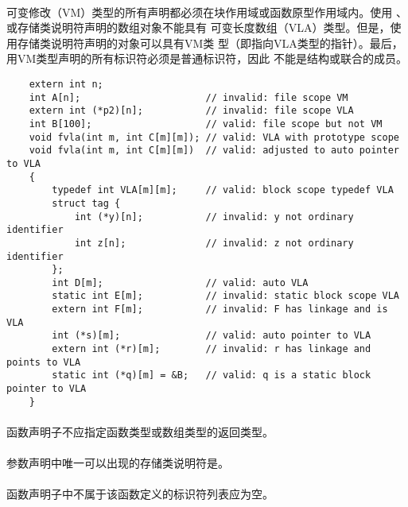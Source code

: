 \paragraph{}
\ex 可变修改（VM）类型的所有声明都必须在块作用域或函数原型作用域内。使用
、或存储类说明符声明的数组对象不能具有
可变长度数组（VLA）类型。但是，使用存储类说明符声明的对象可以具有VM类
型（即指向VLA类型的指针）。最后，用VM类型声明的所有标识符必须是普通标识符，因此
不能是结构或联合的成员。
\begin{lstlisting}
    extern int n;
    int A[n];                      // invalid: file scope VM
    extern int (*p2)[n];           // invalid: file scope VLA
    int B[100];                    // valid: file scope but not VM
    void fvla(int m, int C[m][m]); // valid: VLA with prototype scope
    void fvla(int m, int C[m][m])  // valid: adjusted to auto pointer to VLA
    {
        typedef int VLA[m][m];     // valid: block scope typedef VLA
        struct tag {
            int (*y)[n];           // invalid: y not ordinary identifier
            int z[n];              // invalid: z not ordinary identifier
        };
        int D[m];                  // valid: auto VLA
        static int E[m];           // invalid: static block scope VLA
        extern int F[m];           // invalid: F has linkage and is VLA
        int (*s)[m];               // valid: auto pointer to VLA
        extern int (*r)[m];        // invalid: r has linkage and points to VLA
        static int (*q)[m] = &B;   // valid: q is a static block pointer to VLA
    }
\end{lstlisting}


\constraint
\paragraph{}
函数声明子不应指定函数类型或数组类型的返回类型。

\paragraph{}
参数声明中唯一可以出现的存储类说明符是。

\paragraph{}
函数声明子中不属于该函数定义的标识符列表应为空。

